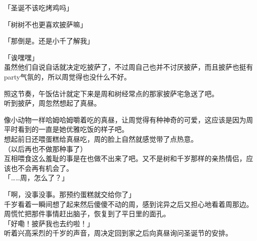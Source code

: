 「圣诞不该吃烤鸡吗」

「树树不也更喜欢披萨嘛」

「那倒是。还是小千了解我」

「诶嘿嘿」\\

虽然他们自说自话就决定吃披萨了，不过周自己也并不讨厌披萨，而且披萨也挺有party气氛的，所以周觉得也没什么不好。

照这节奏，午饭估计就定下来是周和树经常点的那家披萨宅急送了吧。\\

听到披萨，周忽然想起了真昼。

像小动物一样哈姆哈姆嚼着吃的真昼，让周觉得有种神奇的可爱，这应该是因为周平时看到的一直是她优雅吃饭的样子吧。\\

想起前日还喂蛋糕给真昼吃，周的脸上自然就感觉带了点热意。\\

（以后再也不做那种事了）\\

互相喂食这么羞耻的事是在也做不出来了吧。又不是树和千岁那样的亲热情侣，应该也不会再有机会了。\\

「……周，怎么了？」

「啊，没事没事。那预约蛋糕就交给你了」\\

千岁看着一瞬间想了起来然后傻傻不动的周，感到诧异之后又担心地看着周那边。周慌忙把那件事情赶出脑子，恢复到了平日里的面孔。\\

「好嘞！披萨我也去约啦！」\\

听着兴高采烈的千岁的声音，周决定回到家之后向真昼询问圣诞节的安排。\\
